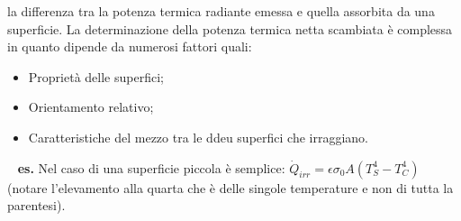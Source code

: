 la differenza tra la potenza termica radiante emessa e quella assorbita da una superficie.\newline
\newline
La determinazione della potenza termica netta scambiata è complessa in quanto dipende da numerosi fattori quali:
\begin{itemize}
    \item Proprietà delle superfici;
    \item Orientamento relativo;
    \item Caratteristiche del mezzo tra le ddeu superfici che irraggiano.
\end{itemize}
\ \newline
 \textbf{es.} Nel caso di una superficie piccola è semplice: $\dot{Q}_{irr} = \epsilon \sigma_{0} A (T_S^4 - T_C^4)$ (notare l'elevamento alla quarta che è delle singole temperature e non di tutta la parentesi).